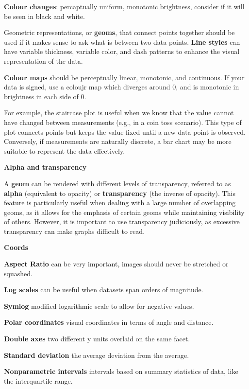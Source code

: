 \documentclass{article}
\begin{document}
\textbf{Colour changes}: percaptually uniform, monotonic brightness, consider if it will be seen in black and white.

Geometric representations, or \textbf{geoms}, that connect points together should be used if it makes sense to ask what is between two data points.
\textbf{Line styles} can have variable thickness, variable color, and dash patterns to enhance the visual representation of the data.

\textbf{Colour maps} should be perceptually linear, monotonic, and continuous.
If your data is signed, use a coloujr map which diverges around 0, and is monotonic in brightness in each side of 0.

For example, the staircase plot is useful when we know that the value cannot have changed between measurements (e.g., in a coin toss scenario).
This type of plot connects points but keeps the value fixed until a new data point is observed.
Conversely, if measurements are naturally discrete, a bar chart may be more suitable to represent the data effectively.

\textbf{Alpha and transparency}

A \textbf{geom} can be rendered with different levels of transparency, referred to as \textbf{alpha} (equivalent to opacity) or
\textbf{transparency} (the inverse of opacity). This feature is particularly useful when dealing with a large number
of overlapping geoms, as it allows for the emphasis of certain geoms while maintaining visibility of others.
However, it is important to use transparency judiciously, as excessive transparency can make graphs difficult to read.

\vspace{\baselineskip}

\textbf{Coords}

\textbf{Aspect Ratio} can be very important, images should never be stretched or squashed.

\textbf{Log scales} can be useful when datasets span orders of magnitude.

\textbf{Symlog} modified logarithmic scale to allow for negative values.

\textbf{Polar coordinates} visual coordinates in terms of angle and distance.

\textbf{Double axes} two different y units overlaid on the same facet.

\textbf{Standard deviation} the average deviation from the average.

\textbf{Nonparametric intervals} intervals based on summary statistics of data, like the interquartile range.
\end{document}
